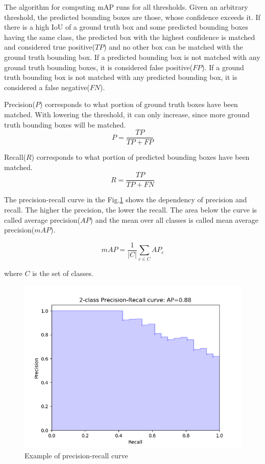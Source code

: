 \documentclass[a4paper,12pt,titlepage]{article}
\numberwithin{figure}{section}
\begin{document}
The algorithm for computing mAP runs for all thresholds. Given an arbitrary threshold, the predicted bounding boxes are those, whose confidence exceeds it. If there is a high IoU of a ground truth box and some predicted bounding boxes having the same class, the predicted box with the highest confidence is matched and considered true positive($TP$) and no other box can be matched with the ground truth bounding box. If a predicted bounding box is not matched with any ground truth bounding boxes, it is considered false positive($FP$). If a ground truth bounding box is not matched with any predicted bounding box, it is considered a false negative($FN$).

Precision($P$) corresponds to what portion of ground truth boxes have been matched. With lowering the threshold, it can only increase, since more ground truth bounding boxes will be matched.
\begin{equation}
P = \frac{TP}{TP + FP}
\end{equation}

Recall($R$) corresponds to what portion of predicted bounding boxes have been matched. 
\begin{equation}
R = \frac{TP}{TP + FN}
\end{equation}

The precision-recall curve in the Fig.\ref{fig:precision-recall} shows the dependency of precision and recall. The higher the precision, the lower the recall. The area below the curve is called average precision($AP$) and the mean over all classes is called mean average precision($mAP$).

\begin{equation}
mAP = \frac{1}{|C|} \sum_{c \in C} AP_c
\end{equation}

where $C$ is the set of classes.

\begin{figure}[H]
\centering
\includegraphics[width=1\linewidth]{fig/precision-recall.png}
\caption{Example of precision-recall curve}
\label{fig:precision-recall}
\end{figure}








{}
\cleardoublepage
\clearpage
\end{document}
